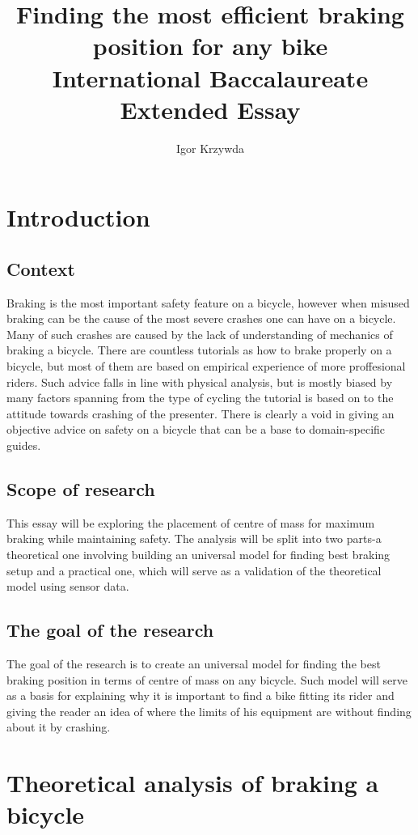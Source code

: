 \documentclass[12pt]{article}
\title{Finding the most efficient braking position for any bike\\
	\large International Baccalaureate Extended Essay}
\author{Igor Krzywda}
\begin{document}
\maketitle

\section{Introduction}
\subsection{Context}
Braking is the most important safety feature on a bicycle, however when misused braking can be the cause of the
most severe crashes one can have on a bicycle. Many of such crashes are caused by the lack of understanding of
mechanics of braking a bicycle. There are countless tutorials as how to brake properly on a bicycle, but most of
them are based on empirical experience of more proffesional riders. Such advice falls in line with physical 
analysis, but is mostly biased by many factors spanning from the type of cycling the tutorial is based on to 
the attitude towards crashing of the presenter. There is clearly a void in giving an objective advice on safety 
on a bicycle that can be a base to domain-specific guides.

\subsection{Scope of research}
This essay will be exploring the placement of centre of mass for maximum braking while maintaining safety. 
The analysis will be split into two parts-a theoretical one involving building an universal model for finding 
best braking setup and a practical one, which will serve as a validation of the theoretical model using sensor
data.

\subsection{The goal of the research}
The goal of the research is to create an universal model for finding the best braking position in terms of
centre of mass on any bicycle. Such model will serve as a basis for explaining why it is important to find 
a bike fitting its rider and giving the reader an idea of where the limits of his equipment are without 
finding about it by crashing.

\section{Theoretical analysis of braking a bicycle}
\end{document}
